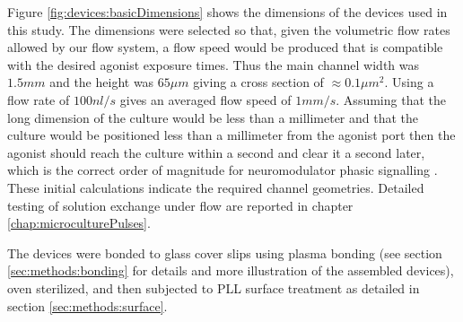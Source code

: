     Figure \ref{fig:devices:basicDimensions} shows the dimensions of the devices used in this study. The dimensions were selected so that, given the volumetric flow rates allowed by our flow system, a flow speed would be produced that is compatible with the desired agonist exposure times. Thus the main channel width was \(1.5 mm\) and the height was \(65 \mu m\) giving a cross section of \(\approx 0.1 \mu m^{2}\). Using a flow rate of \(100 nl/s\) gives an averaged flow speed of \(1 mm/s\). Assuming that the long dimension of the culture would be less than a millimeter and that the culture would be positioned less than a millimeter from the agonist port then the agonist should reach the culture within a second and clear it a second later, which is the correct order of magnitude for neuromodulator phasic signalling \cite{venton2003real}. These initial calculations indicate the required channel geometries. Detailed testing of solution exchange under flow are reported in chapter \ref{chap:microculturePulses}.

    The devices were bonded to glass cover slips using plasma bonding (see section \ref{sec:methods:bonding} for details and more illustration of the assembled devices), oven sterilized, and then subjected to PLL surface treatment as detailed in section \ref{sec:methods:surface}.

